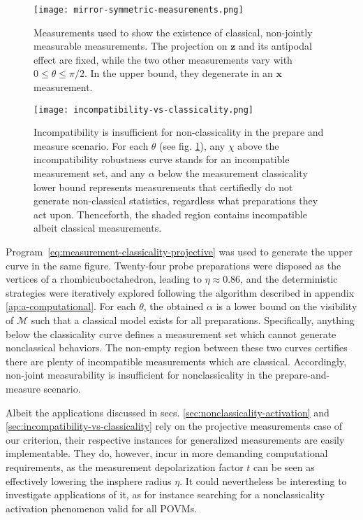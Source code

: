             \begin{figure}
                \centering
                \texttt{[image: mirror-symmetric-measurements.png]}
                \caption{Measurements used to show the existence of classical, non-jointly measurable measurements. The projection on $\mathbf{z}$ and its antipodal effect are fixed, while the two other measurements vary with $0 \leq \theta \leq \pi/2$. In the upper bound, they degenerate in an $\mathbf{x}$ measurement.}
            \label{fig:mirror-symmetric-measurements}
            \end{figure}
            \begin{figure}
                \centering
                \texttt{[image: incompatibility-vs-classicality.png]}
                \caption{ Incompatibility is insufficient for non-classicality in the prepare and measure scenario. For each $\theta$ (see fig. \ref{fig:mirror-symmetric-measurements}), any $\chi$ above the incompatibility robustness curve stands for an incompatible measurement set, and any $\alpha$ below the measurement classicality lower bound represents measurements that certifiedly do not generate non-classical statistics, regardless what preparations they act upon. Thenceforth, the shaded region contains incompatible albeit classical measurements.}
            \label{fig:incompatibility-vs-classicality}
            \end{figure}

            Program~\eqref{eq:measurement-classicality-projective} was used to generate the upper curve in the same figure. Twenty-four probe preparations were disposed as the vertices of a rhombicuboctahedron, leading to $\eta \approx 0.86$, and the deterministic strategies were iteratively explored following the algorithm described in appendix \ref{ap:a-computational}. For each $\theta$, the obtained $\alpha$ is a lower bound on the visibility of $\mathcal{M}$ such that a classical model exists for all preparations. Specifically, anything below the classicality curve defines a measurement set which cannot generate nonclassical behaviors. The non-empty region between these two curves certifies there are plenty of incompatible measurements which are classical. Accordingly, non-joint measurability is insufficient for nonclassicality in the prepare-and-measure scenario.

            \ornamentbreak

        Albeit the applications discussed in secs. \ref{sec:nonclassicality-activation} and \ref{sec:incompatibility-vs-classicality} rely on the projective measurements case of our criterion, their respective instances for generalized measurements are easily implementable. They do, however, incur in more demanding computational requirements, as the measurement depolarization factor $t$ can be seen as effectively lowering the insphere radius $\eta$. It could nevertheless be interesting to investigate applications of it, as for instance searching for a nonclassicality activation phenomenon valid for all POVMs.

